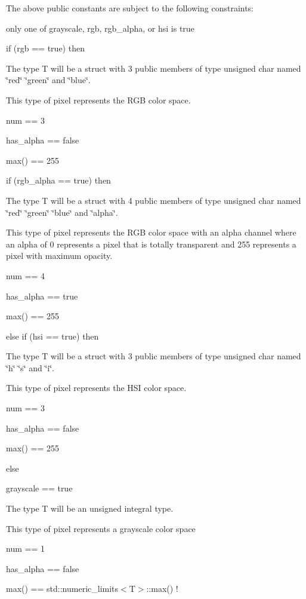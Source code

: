 The above public constants are subject to the following constraints:
\begin{DoxyItemize}
\item only one of grayscale, rgb, rgb\_\-alpha, or hsi is true
\item if (rgb == true) then
\begin{DoxyItemize}
\item The type T will be a struct with 3 public members of type unsigned char named \char`\"{}red\char`\"{} \char`\"{}green\char`\"{} and \char`\"{}blue\char`\"{}.
\item This type of pixel represents the RGB color space.
\item num == 3
\item has\_\-alpha == false
\item max() == 255
\end{DoxyItemize}
\item if (rgb\_\-alpha == true) then
\begin{DoxyItemize}
\item The type T will be a struct with 4 public members of type unsigned char named \char`\"{}red\char`\"{} \char`\"{}green\char`\"{} \char`\"{}blue\char`\"{} and \char`\"{}alpha\char`\"{}.
\item This type of pixel represents the RGB color space with an alpha channel where an alpha of 0 represents a pixel that is totally transparent and 255 represents a pixel with maximum opacity.
\item num == 4
\item has\_\-alpha == true
\item max() == 255
\end{DoxyItemize}
\item else if (hsi == true) then
\begin{DoxyItemize}
\item The type T will be a struct with 3 public members of type unsigned char named \char`\"{}h\char`\"{} \char`\"{}s\char`\"{} and \char`\"{}i\char`\"{}.
\item This type of pixel represents the HSI color space.
\item num == 3
\item has\_\-alpha == false
\item max() == 255
\end{DoxyItemize}
\item else
\begin{DoxyItemize}
\item grayscale == true
\item The type T will be an unsigned integral type.
\item This type of pixel represents a grayscale color space
\item num == 1
\item has\_\-alpha == false
\item max() == std::numeric\_\-limits$<$T$>$::max() ! 
\end{DoxyItemize}
\end{DoxyItemize}

